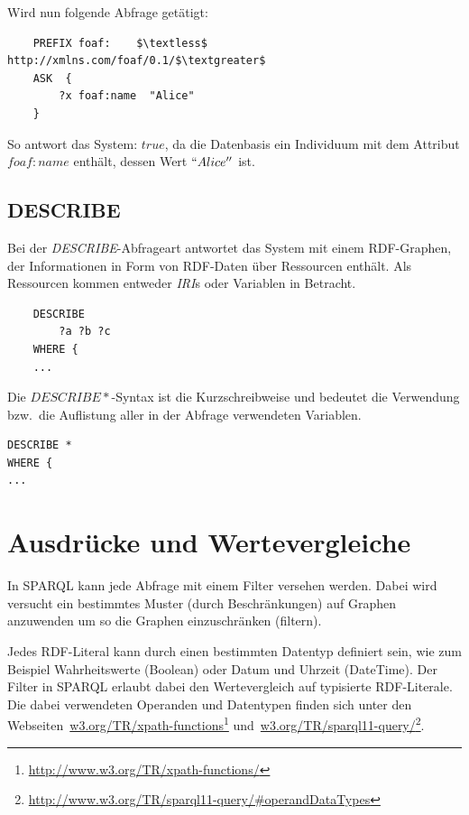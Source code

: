 Wird nun folgende Abfrage getätigt:
\lstset{language=XML}
\begin{lstlisting}
    PREFIX foaf:    $\textless$ http://xmlns.com/foaf/0.1/$\textgreater$ 
    ASK  { 
        ?x foaf:name  "Alice"
    }
\end{lstlisting}
So antwort das System: $true$, da die Datenbasis ein Individuum mit dem Attribut $foaf:name$ enthält, dessen Wert $``Alice''$ ist.

\subsection{DESCRIBE}
\label{subsec:sparql_abfragearten_describe}
Bei der \textit{DESCRIBE}-Abfrageart antwortet das System mit einem RDF-Graphen, der Informationen in Form von RDF-Daten über Ressourcen enthält. Als Ressourcen kommen entweder \textit{IRI}s oder Variablen in Betracht.

\begin{lstlisting}
    DESCRIBE
        ?a ?b ?c
    WHERE {
    ...
\end{lstlisting}

Die $ DESCRIBE * $-Syntax ist die Kurzschreibweise und bedeutet die Verwendung bzw.\ die Auflistung aller in der Abfrage verwendeten Variablen.
\begin{lstlisting}
DESCRIBE *
WHERE {
...
\end{lstlisting}

\section{Ausdrücke und Wertevergleiche}
\label{sec:sparql_ausdruecke}
In SPARQL kann jede Abfrage mit einem Filter versehen werden. Dabei wird versucht ein bestimmtes Muster (durch Beschränkungen) auf Graphen anzuwenden um so die Graphen einzuschränken (filtern).

Jedes RDF-Literal kann durch einen bestimmten Datentyp definiert sein, wie zum Beispiel Wahrheitswerte (Boolean) oder Datum und Uhrzeit (DateTime). Der Filter in SPARQL erlaubt dabei den Wertevergleich auf typisierte RDF-Literale. Die dabei verwendeten Operanden und Datentypen finden sich unter den Webseiten~\href{http://www.w3.org/TR/xpath-functions/}{w3.org/TR/xpath-functions}\footnote{\url{http://www.w3.org/TR/xpath-functions/}} und~\href{http://www.w3.org/TR/sparql11-query/\#operandDataTypes}{w3.org/TR/sparql11-query/}\footnote{\url{http://www.w3.org/TR/sparql11-query/\#operandDataTypes}}.

